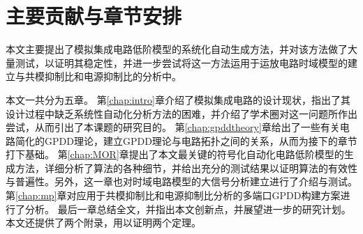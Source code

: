 \section{主要贡献与章节安排}
\label{sec:intro:org}

本文主要提出了模拟集成电路低阶模型的系统化自动生成方法，并对该方法做了大量测试，以证明其稳定性，并进一步尝试将这一方法运用于运放电路时域模型的建立与共模抑制比和电源抑制比的分析中。

本文一共分为五章。
第\ref{chap:intro}章介绍了模拟集成电路的设计现状，指出了其设计过程中缺乏系统性自动化分析方法的困难，并介绍了学术圈对这一问题所作出尝试，从而引出了本课题的研究目的。
第\ref{chap:gpddtheory}章给出了一些有关电路简化的GPDD理论，建立GPDD理论与电路拓扑之间的关系，从而为接下的章节打下基础。
第\ref{chap:MOR}章提出了本文最关键的符号化自动化电路低阶模型的生成方法，详细分析了算法的各种细节，并给出充分的测试结果以证明算法的有效性与普遍性。另外，这一章也对时域电路模型的大信号分析建立进行了介绍与测试。
第\ref{chap:mp}章对应用于共模抑制比和电源抑制比分析的多端口GPDD构建方案进行了分析。
最后一章总结全文，并指出本文创新点，并展望进一步的研究计划。
本文还提供了两个附录，用以证明两个定理。